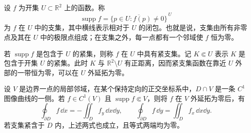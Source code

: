 \begin{definition}
	设 $f$ 为开集 $U\subset\mathbb R^2$ 上的函数。称
	\[
	\operatorname{supp}f=\overline{\{p\in U:f(p)\ne0\}}^{\,U}
	\]
	为 $f$ 在 $U$ 中的支集，其中横线表示相对于 $U$ 的闭包。也就是说，支集由所有非零点及其在 $U$ 中的极限点组成；在支集之外，每一点都有一个邻域使 $f$ 恒为零。
	
	若 $\operatorname{supp}f$ 是包含于 $U$ 的紧集，则称 $f$ 在 $U$ 中具有紧支集。记 $K\Subset U$ 表示 $K$ 是包含于开集 $U$ 的紧集。此时 $K$ 与 $\mathbb R^2\setminus U$ 有正距离，因而紧支集函数在靠近 $U$ 外部的一带恒为零，可以在 $U$ 外延拓为零。
\end{definition}
\begin{lemma}[局部计算]
设 $V$ 是边界一点的局部邻域，在某个保持定向的正交坐标系中，$D\cap V$ 是一条 $C^1$ 图像曲线的一侧。若 $f\in C^1(V)$ 且 $\operatorname{supp}f\Subset V$，则将 $f$ 在 $V$ 外延拓为零后，有
\[
\oint_{\partial D} f\,\dd x
=-\displaystyle\iint_D f_y\,\dd x\dd y,
\qquad
\oint_{\partial D} f\,\dd y
=\displaystyle\iint_D f_x\,\dd x\dd y.
\]
若支集紧含于 $D$ 内，上述两式也成立，且等式两端均为零。
\end{lemma}
